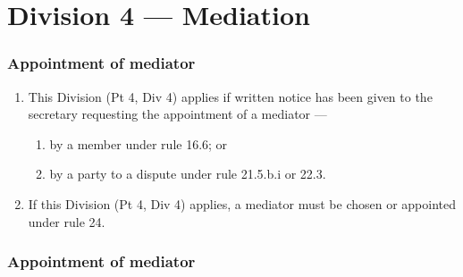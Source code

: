 \hypertarget{division-4-mediation}{%
\part*{Division 4 --- Mediation}\label{division-4-mediation}}

\hypertarget{appointment-of-mediator}{%
\section{Appointment of mediator}\label{appointment-of-mediator}}

\begin{enumerate}

\item This Division (Pt 4, Div 4) applies if written notice has been given to the secretary requesting the appointment of a mediator ---

  \begin{enumerate}
  
  \item by a member under rule 16.6; or
  \item by a party to a dispute under rule 21.5.b.i or 22.3.
  \end{enumerate}
\item If this Division (Pt 4, Div 4) applies, a mediator must be chosen or appointed under rule 24.
\end{enumerate}

\hypertarget{appointment-of-mediator-1}{%
\section{Appointment of mediator}\label{appointment-of-mediator-1}}


